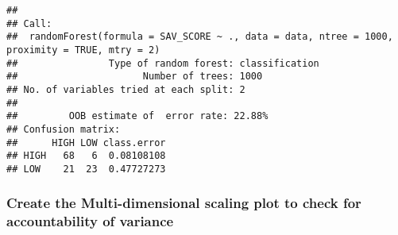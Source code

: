 \documentclass[
]{article}
\begin{document}
\begin{verbatim}
## 
## Call:
##  randomForest(formula = SAV_SCORE ~ ., data = data, ntree = 1000,      proximity = TRUE, mtry = 2) 
##                Type of random forest: classification
##                      Number of trees: 1000
## No. of variables tried at each split: 2
## 
##         OOB estimate of  error rate: 22.88%
## Confusion matrix:
##      HIGH LOW class.error
## HIGH   68   6  0.08108108
## LOW    21  23  0.47727273
\end{verbatim}

\hypertarget{create-the-multi-dimensional-scaling-plot-to-check-for-accountability-of-variance}{%
\subsubsection{Create the Multi-dimensional scaling plot to check for
accountability of
variance}\label{create-the-multi-dimensional-scaling-plot-to-check-for-accountability-of-variance}}
\end{document}
